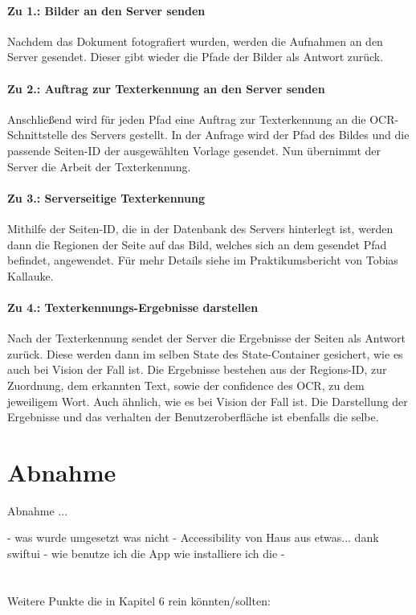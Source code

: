 \documentclass[nomenclature, oneside, 150]{HSMW-Thesis}
\begin{document}
				\paragraph{Zu 1.: Bilder an den Server senden}
				Nachdem das Dokument fotografiert wurden, werden die Aufnahmen an den Server gesendet. Dieser gibt wieder die Pfade der Bilder als Antwort zurück. 
				
				\paragraph{Zu 2.: Auftrag zur Texterkennung an den Server senden}
				Anschließend wird für jeden Pfad eine Auftrag zur Texterkennung an  die OCR-Schnittstelle des Servers gestellt. In der Anfrage wird der Pfad des Bildes und die passende Seiten-ID der ausgewählten Vorlage gesendet. Nun übernimmt der Server die Arbeit der Texterkennung. 
				
				\paragraph{Zu 3.: Serverseitige Texterkennung}
				Mithilfe der Seiten-ID, die in der Datenbank des Servers hinterlegt ist, werden dann die Regionen der Seite auf das Bild, welches sich an dem gesendet Pfad befindet, angewendet. Für mehr Details siehe im Praktikumsbericht von Tobias Kallauke. 
				
				\paragraph{Zu 4.: Texterkennungs-Ergebnisse darstellen}
				Nach der Texterkennung sendet der Server die Ergebnisse der Seiten als Antwort zurück. Diese werden dann im selben State des State-Container gesichert, wie es auch bei Vision der Fall ist. Die Ergebnisse bestehen aus der Regions-ID, zur Zuordnung, dem erkannten Text, sowie der confidence des OCR, zu dem jeweiligem Wort. Auch ähnlich, wie es bei Vision der Fall ist. Die Darstellung der Ergebnisse und das verhalten der Benutzeroberfläche ist ebenfalls die selbe.
		
	\section{Abnahme}	
		Abnahme ... 
		
	- was wurde umgesetzt was nicht
	- Accessibility 	von Haus aus etwas... dank swiftui
	- wie benutze ich die App wie installiere ich die
	- 
		\\ \\ \\
	Weitere Punkte die in Kapitel 6 rein könnten/sollten: 
	
\end{document}
